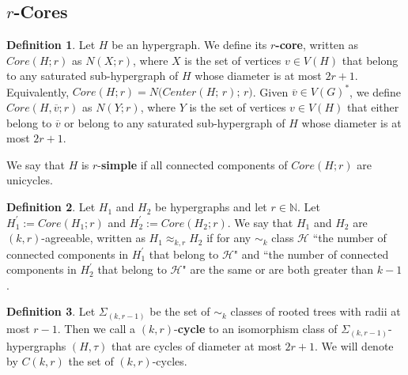 \documentclass[12pt,notitlepage,a4paper]{article}
\theoremstyle{definition}
\newtheorem{definition}{Definition}[section]
\newcommand{\N}{\mathbb{N}}
\begin{document}
\subsection{$r$-Cores}

\begin{definition} \label{def:Core}
	Let $H$ be an hypergraph. We define its \textbf{$r$-core}, 
	written as $Core(H;r)$ as $N(X;r)$,
	where $X$ is the set of vertices $v\in V(H)$
	that belong to any saturated sub-hypergraph of $H$
	whose diameter is at most $2r+1$. 
	Equivalently, $Core(H;r)=N\big(Center(H;\, r);\, r\big)$. Given 
	$\overline{v}\in V(G)^*$, we define $Core(H,\overline{v};r)$
	as $N(Y;r)$, where $Y$ is the set of vertices $v\in V(H)$ that either
	belong to $\overline{v}$ or belong to any saturated sub-hypergraph of $H$
	whose diameter is at most $2r+1$. \par
	We say that $H$ is $r$-\textbf{simple} if all connected components
	of $Core(H;r)$ are unicycles.
\end{definition}	

\begin{definition} \label{def:agreeability}
	Let $H_1$ and $H_2$ be hypergraphs and let $r\in \N$.
	Let $H^\prime_1:=Core(H_1;r)$ and $H^\prime_2:=Core(H_2;r)$. 
	We say that $H_1$ and $H_2$ are $(k,r)$-agreeable, written
	as $H_1\approx_{k,r} H_2$ if for any $\sim_k$ class $\mathcal{H}$ 
	``the number of connected
	components in $H^\prime_1$ that belong to $\mathcal{H}$" and
	``the number of connected components in $H^\prime_2$ that belong to 
	$\mathcal{H}$" are the same or are both greater than $k-1$.\par

\end{definition}



\begin{definition}
	Let $\Sigma_{(k,r-1)}$ be the set of $\sim_k$ classes
	of rooted trees with radii at most $r-1$. Then
	we call a $(k,r)$-\textbf{cycle} to an isomorphism class
	of $\Sigma_{(k,r-1)}$-hypergraphs 
	$(H,\tau)$ that are cycles of diameter at most $2r+1$.
	We will denote by $C(k,r)$ the set of $(k,r)$-cycles.
\end{definition}
\end{document}
